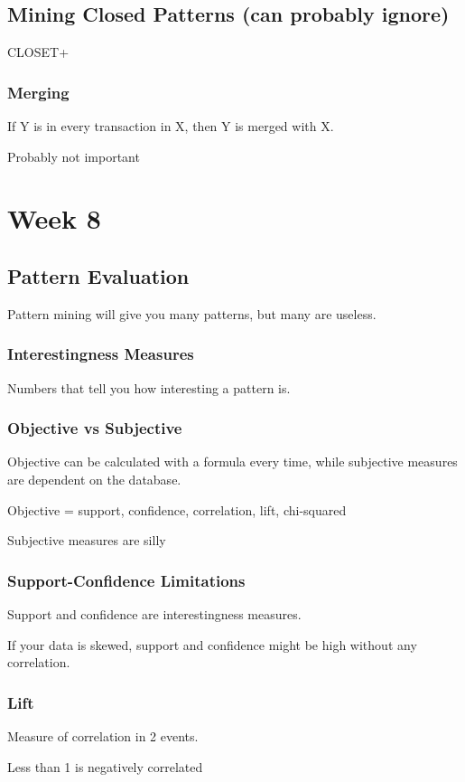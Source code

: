 \documentclass[fleqn]{report}
\begin{document}
\section{Mining Closed Patterns (can probably ignore)}
CLOSET+ 

\subsection{Merging}
If Y is in every transaction in X, then Y is 
merged with X. 

Probably not important

\chapter{Week 8}
\section{Pattern Evaluation}
Pattern mining will give you many patterns, but many are useless. 

\subsection{Interestingness Measures}
Numbers that tell you how interesting a pattern is. 

\subsection{Objective vs Subjective}
Objective can be calculated with a formula every time, 
while subjective measures are dependent on the database.

Objective = support, confidence, correlation, lift, chi-squared 

Subjective measures are silly

\subsection{Support-Confidence Limitations}
Support and confidence are interestingness measures.

If your data is skewed, support and confidence might 
be high without any correlation.

\subsection{Lift}
Measure of correlation in 2 events. 

Less than 1 is negatively correlated 
\end{document}
